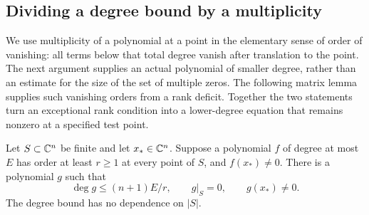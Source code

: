 \subsection{Dividing a degree bound by a multiplicity}

We use multiplicity of a polynomial at a point in the elementary sense
of order of vanishing: all terms below that total degree vanish after
translation to the point.  The next argument supplies an actual
polynomial of smaller degree, rather than an estimate for the size of
the set of multiple zeros.  The following matrix lemma supplies such
vanishing orders from a rank deficit.  Together the two statements turn
an exceptional rank condition into a lower-degree equation that remains
nonzero at a specified test point.

\begin{lemma}\label{poly:compression}
Let $S\subset\mathbb C^n$ be finite and let $x_*\in\mathbb C^n$.  Suppose a polynomial
$f$ of degree at most $E$ has order at least $r\ge1$ at every point of
$S$, and $f(x_*)\ne0$.  There is a polynomial $g$ such that
\[
 \deg g\le (n+1)E/r,\qquad
 g|_S=0,\qquad g(x_*)\ne0.
\]
The degree bound has no dependence on $|S|$.
\end{lemma}

